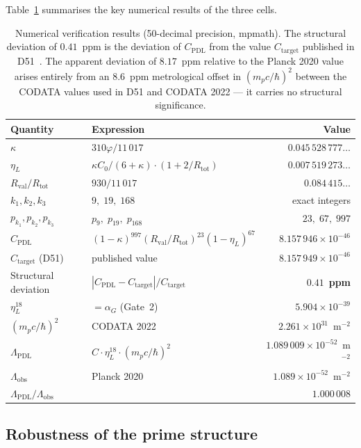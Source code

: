 \documentclass[12pt,a4paper]{article}
\theoremstyle{plain}
\theoremstyle{definition}
\theoremstyle{remark}
\newcommand{\hb}{\hbar}
\newcommand{\Rtot}{R_{\mathrm{tot}}}
\newcommand{\Rval}{R_{\mathrm{val}}}
\newcommand{\kap}{\kappa}
\newcommand{\etaL}{\eta_L}
\newcommand{\vp}{\varphi}
\newcommand{\Lam}{\Lambda}
\begin{document}
Table~\ref{tab:numerical} summarises the key numerical results of the three cells.

\begin{table}[H]
\centering
\caption{Numerical verification results (50-decimal precision, mpmath). The structural deviation of $0.41$~ppm is the deviation of $C_{\mathrm{PDL}}$ from the value $C_{\mathrm{target}}$ published in D51~\cite{PDL_D51_2026}. The apparent deviation of $8.17$~ppm relative to the Planck 2020 value arises entirely from an $8.6$~ppm metrological offset in $(m_p c/\hb)^2$ between the CODATA values used in D51 and CODATA 2022 — it carries no structural significance.}
\label{tab:numerical}
\renewcommand{\arraystretch}{1.3}
\begin{tabular}{llr}
\toprule
Quantity & Expression & Value \\
\midrule
$\kap$ & $310\vp/11\,017$ & $0.045\,528\,777\ldots$ \\
$\etaL$ & $\kap C_0/(6+\kap)\cdot(1+2/\Rtot)$ & $0.007\,519\,273\ldots$ \\
$\Rval/\Rtot$ & $930/11\,017$ & $0.084\,415\ldots$ \\
$k_1, k_2, k_3$ & $9,\; 19,\; 168$ & exact integers \\
$p_{k_1}, p_{k_2}, p_{k_3}$ & $p_9,\; p_{19},\; p_{168}$ & $23,\; 67,\; 997$ \\
$C_{\mathrm{PDL}}$ & $(1-\kap)^{997}(\Rval/\Rtot)^{23}(1-\etaL)^{67}$ & $8.157\,946 \times 10^{-46}$ \\
$C_{\mathrm{target}}$ (D51) & published value & $8.157\,949 \times 10^{-46}$ \\
Structural deviation & $|C_{\mathrm{PDL}} - C_{\mathrm{target}}|/C_{\mathrm{target}}$ & $\mathbf{0.41}$~\textbf{ppm} \\
$\etaL^{18}$ & $= \alpha_G$ (Gate~2) & $5.904 \times 10^{-39}$ \\
$(m_p c/\hb)^2$ & CODATA 2022 & $2.261 \times 10^{31}$~m$^{-2}$ \\
$\Lam_{\mathrm{PDL}}$ & $C \cdot \etaL^{18} \cdot (m_p c/\hb)^2$ & $1.089\,009 \times 10^{-52}$~m$^{-2}$ \\
$\Lam_{\mathrm{obs}}$ & Planck 2020~\cite{Planck2020} & $1.089 \times 10^{-52}$~m$^{-2}$ \\
$\Lam_{\mathrm{PDL}}/\Lam_{\mathrm{obs}}$ & & $1.000\,008$ \\
\bottomrule
\end{tabular}
\end{table}

\subsection{Robustness of the prime structure}
\label{subsec:robustness}
\end{document}
